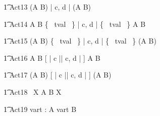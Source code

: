 \begin{circusaction} 
        \t1 Act13 \circdef (A \circtimedinterrupt {} \rcirctime B) \lpar | \lchanset c, d \rchanset | \rpar (A \circtimedinterrupt {} \rcirctime B) \\
\end{circusaction}
        

\begin{circusaction}
        \t1 Act14 \circdef A \circtimedinterrupt {} \rcirctime B \lpar \{~ tval ~\} | \lchanset c, d \rchanset | \{~ tval ~\} \rpar A \circtimedinterrupt {} \rcirctime B \\
\end{circusaction}

\begin{circusaction}
        \t1 Act15 \circdef (A \circtimedinterrupt {} \rcirctime B) \lpar \{~ tval ~\} | \lchanset c, d \rchanset | \{~ tval ~\} \rpar (A \circtimedinterrupt {} \rcirctime B) \\
\end{circusaction}
   
\begin{circusaction}
        \t1 Act16 \circdef A \circtimedinterrupt {} \rcirctime B [ | \lchanset c \rchanset || \lchanset c, d \rchanset | ] A \circtimedinterrupt {} \rcirctime B \\
\end{circusaction}

\begin{circusaction}
        \t1 Act17 \circdef (A \circtimedinterrupt {} \rcirctime B) [ | \lchanset c \rchanset || \lchanset c, d \rchanset | ] (A \circtimedinterrupt {} \rcirctime B) \\
\end{circusaction}

\begin{circusaction}
	\t1 Act18 \circdef \circmu~X \circspot A \circtimedinterrupt {} \rcirctime B \circseq X \\
\end{circusaction}

\begin{circusaction}
	\t1 Act19 \circdef \circvres vart : \nat \circspot A \circtimedinterrupt \lcirctime vart \rcirctime B \\
\end{circusaction}

